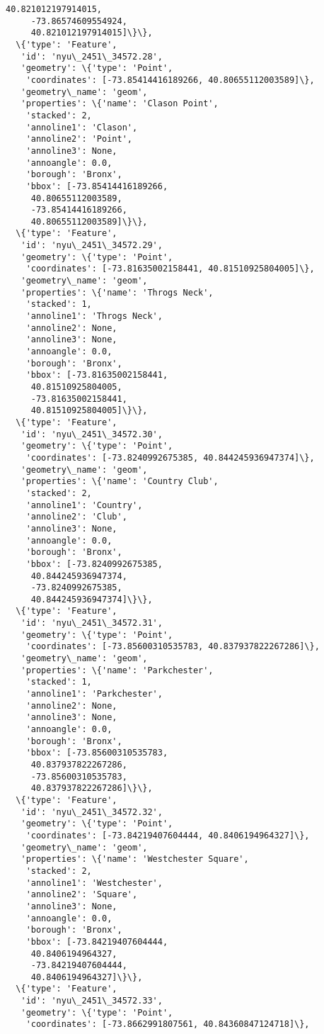 \documentclass[11pt]{article}
\begin{document}
\begin{tcolorbox}[breakable, size=fbox, boxrule=.5pt, pad at break*=1mm, opacityfill=0]
\begin{Verbatim}[commandchars=\\\{\}]
     40.821012197914015,
     -73.86574609554924,
     40.821012197914015]\}\},
  \{'type': 'Feature',
   'id': 'nyu\_2451\_34572.28',
   'geometry': \{'type': 'Point',
    'coordinates': [-73.85414416189266, 40.80655112003589]\},
   'geometry\_name': 'geom',
   'properties': \{'name': 'Clason Point',
    'stacked': 2,
    'annoline1': 'Clason',
    'annoline2': 'Point',
    'annoline3': None,
    'annoangle': 0.0,
    'borough': 'Bronx',
    'bbox': [-73.85414416189266,
     40.80655112003589,
     -73.85414416189266,
     40.80655112003589]\}\},
  \{'type': 'Feature',
   'id': 'nyu\_2451\_34572.29',
   'geometry': \{'type': 'Point',
    'coordinates': [-73.81635002158441, 40.81510925804005]\},
   'geometry\_name': 'geom',
   'properties': \{'name': 'Throgs Neck',
    'stacked': 1,
    'annoline1': 'Throgs Neck',
    'annoline2': None,
    'annoline3': None,
    'annoangle': 0.0,
    'borough': 'Bronx',
    'bbox': [-73.81635002158441,
     40.81510925804005,
     -73.81635002158441,
     40.81510925804005]\}\},
  \{'type': 'Feature',
   'id': 'nyu\_2451\_34572.30',
   'geometry': \{'type': 'Point',
    'coordinates': [-73.8240992675385, 40.844245936947374]\},
   'geometry\_name': 'geom',
   'properties': \{'name': 'Country Club',
    'stacked': 2,
    'annoline1': 'Country',
    'annoline2': 'Club',
    'annoline3': None,
    'annoangle': 0.0,
    'borough': 'Bronx',
    'bbox': [-73.8240992675385,
     40.844245936947374,
     -73.8240992675385,
     40.844245936947374]\}\},
  \{'type': 'Feature',
   'id': 'nyu\_2451\_34572.31',
   'geometry': \{'type': 'Point',
    'coordinates': [-73.85600310535783, 40.837937822267286]\},
   'geometry\_name': 'geom',
   'properties': \{'name': 'Parkchester',
    'stacked': 1,
    'annoline1': 'Parkchester',
    'annoline2': None,
    'annoline3': None,
    'annoangle': 0.0,
    'borough': 'Bronx',
    'bbox': [-73.85600310535783,
     40.837937822267286,
     -73.85600310535783,
     40.837937822267286]\}\},
  \{'type': 'Feature',
   'id': 'nyu\_2451\_34572.32',
   'geometry': \{'type': 'Point',
    'coordinates': [-73.84219407604444, 40.8406194964327]\},
   'geometry\_name': 'geom',
   'properties': \{'name': 'Westchester Square',
    'stacked': 2,
    'annoline1': 'Westchester',
    'annoline2': 'Square',
    'annoline3': None,
    'annoangle': 0.0,
    'borough': 'Bronx',
    'bbox': [-73.84219407604444,
     40.8406194964327,
     -73.84219407604444,
     40.8406194964327]\}\},
  \{'type': 'Feature',
   'id': 'nyu\_2451\_34572.33',
   'geometry': \{'type': 'Point',
    'coordinates': [-73.8662991807561, 40.84360847124718]\},

\end{Verbatim}
\end{tcolorbox}
\end{document}

